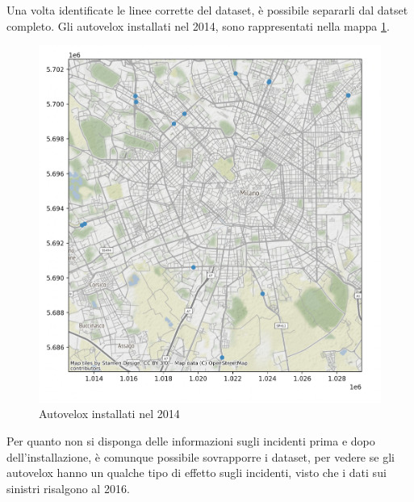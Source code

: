 \documentclass[a4paper]{report}
\begin{document}
Una volta identificate le linee corrette del dataset, è possibile separarli dal datset completo.
Gli autovelox installati nel 2014, sono rappresentati nella mappa \ref{fig:autovelox-2014}.
\begin{figure}
    \includegraphics[width=\linewidth]{../src/autovelox/autovelox_2014.png}
    \caption{Autovelox installati nel 2014}
    \label{fig:autovelox-2014}
\end{figure}

Per quanto non si disponga delle informazioni sugli incidenti prima e dopo dell'installazione, 
è comunque possibile sovrapporre i dataset, per vedere se gli autovelox hanno un qualche tipo di 
effetto sugli incidenti, visto che i dati sui sinistri risalgono al 2016.
\end{document}
